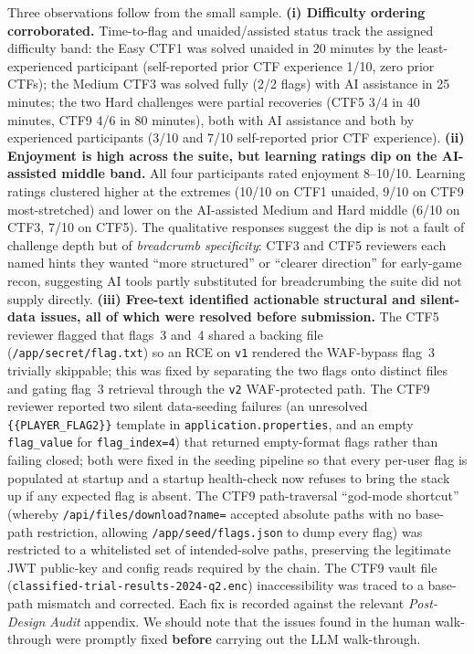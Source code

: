 Three observations follow from the small sample.
\textbf{(i) Difficulty ordering corroborated.} Time-to-flag and
unaided/assisted status track the assigned difficulty band:
the Easy CTF1 was solved unaided in 20 minutes by the
least-experienced participant (self-reported prior CTF
experience 1/10, zero prior CTFs); the Medium CTF3 was solved
fully (2/2 flags) with AI assistance in 25 minutes; the two
Hard challenges were partial recoveries (CTF5 3/4 in 40
minutes, CTF9 4/6 in 80 minutes), both with AI assistance and
both by experienced participants (3/10 and 7/10 self-reported
prior CTF experience).
\textbf{(ii) Enjoyment is high across the suite, but learning
ratings dip on the AI-assisted middle band.} All four
participants rated enjoyment 8--10/10. Learning ratings
clustered higher at the extremes (10/10 on CTF1 unaided,
9/10 on CTF9 most-stretched) and lower on the AI-assisted
Medium and Hard middle (6/10 on CTF3, 7/10 on CTF5). The
qualitative responses suggest the dip is not a fault of
challenge depth but of \emph{breadcrumb specificity}: CTF3 and
CTF5 reviewers each named hints they wanted ``more structured''
or ``clearer direction'' for early-game recon, suggesting AI
tools partly substituted for breadcrumbing the suite did not
supply directly.
\textbf{(iii) Free-text identified actionable structural and
silent-data issues, all of which were resolved before
submission.} The CTF5 reviewer flagged that flags~3 and~4
shared a backing file (\texttt{/app/secret/flag.txt}) so an
RCE on \texttt{v1} rendered the WAF-bypass flag~3 trivially
skippable; this was fixed by separating the two flags onto
distinct files and gating flag~3 retrieval through the
\texttt{v2} WAF-protected path. The CTF9 reviewer reported
two silent data-seeding failures (an unresolved
\texttt{\{\{PLAYER\_FLAG2\}\}} template in
\texttt{application.properties}, and an empty
\texttt{flag\_value} for \texttt{flag\_index=4}) that returned
empty-format flags rather than failing closed; both were
fixed in the seeding pipeline so that every per-user flag is
populated at startup and a startup health-check now refuses
to bring the stack up if any expected flag is absent. The
CTF9 path-traversal ``god-mode shortcut'' (whereby
\texttt{/api/files/download?name=} accepted absolute paths
with no base-path restriction, allowing
\texttt{/app/seed/flags.json} to dump every flag) was
restricted to a whitelisted set of intended-solve paths,
preserving the legitimate JWT public-key and config reads
required by the chain. The CTF9 vault file
(\texttt{classified-trial-results-2024-q2.enc}) inaccessibility
was traced to a base-path mismatch and corrected. Each fix
is recorded against the relevant \textit{Post-Design Audit}
appendix. We should note that the issues found in the human walk-through were promptly fixed \textbf{before} carrying out the LLM walk-through. 

